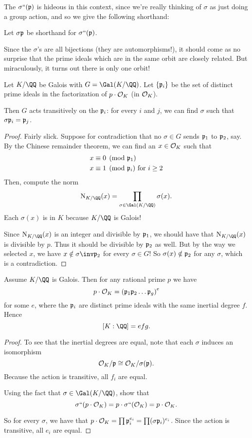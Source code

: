 The $\sigma``(\mathfrak p)$ is hideous in this context, since we're really thinking
of $\sigma$ as just doing a group action, and so we give the following shorthand:
\begin{abuse}
	Let $\sigma\mathfrak p$ be shorthand for $\sigma``(\mathfrak p)$.
\end{abuse}

Since the $\sigma$'s are all bijections (they are automorphisms!),
it should come as no surprise that the prime ideals which are in the same
orbit are closely related.
But miraculously, it turns out there is only one orbit!
\begin{theorem}
	Let $K/\QQ$ be Galois with $G = \Gal(K/\QQ)$.
	Let $\{\mathfrak p_i\}$ be the set of distinct prime ideals in
	the factorization of $p \cdot \mathcal O_K$ (in $\mathcal O_K$).

	Then $G$ acts transitively on the $\mathfrak p_i$:
	for every $i$ and $j$, we can find $\sigma$ such that $\sigma\mathfrak p_i = \mathfrak p_j$.
\end{theorem}
\begin{proof}
	Fairly slick.
	Suppose for contradiction that no $\sigma \in G$ sends $\mathfrak p_1$ to $\mathfrak p_2$, say.
	By the Chinese remainder theorem, we can find an $x \in \mathcal O_K$ such that
	\begin{align*}
		x &\equiv 0 \pmod{\mathfrak p_1} \\
		x &\equiv 1 \pmod{\mathfrak p_i} \text{ for $i \ge 2$}
	\end{align*}
	Then, compute the norm
	\[ \NK(x) = \prod_{\sigma \in \Gal(K/\QQ)} \sigma(x). \]
	Each $\sigma(x)$ is in $K$ because $K/\QQ$ is Galois!

	Since $\NK(x)$ is an integer and divisible by $\mathfrak p_1$,
	we should have that $\NK(x)$ is divisible by $p$.
	Thus it should be divisible by $\mathfrak p_2$ as well.
	But by the way we selected $x$, we have $x \notin \sigma\inv\pp_2$ for every $\sigma \in G$!
	So $\sigma(x) \notin \mathfrak p_2$ for any $\sigma$, which is a contradiction.
\end{proof}
\begin{theorem}
	Assume $K/\QQ$ is Galois.
	Then for any rational prime $p$ we have
	\[ p \cdot \mathcal O_K = \left( \mathfrak p_1 \mathfrak p_2 \dots \mathfrak p_g \right)^e \]
	for some $e$, where the $\mathfrak p_i$ are distinct prime ideals
	with the same inertial degree $f$.
	Hence \[ [K:\QQ] = efg. \]
\end{theorem}
\begin{proof}
	To see that the inertial degrees are equal, note that each $\sigma$
	induces an isomorphism
	\[ \mathcal O_K / \mathfrak p \cong \mathcal O_K / \sigma(\mathfrak p). \]
	Because the action is transitive, all $f_i$ are equal.
	\begin{exercise}
		Using the fact that $\sigma \in \Gal(K/\QQ)$,
		show that \[ \sigma``(p \cdot \mathcal O_K) = p \cdot \sigma``(\mathcal O_K) = p \cdot \mathcal O_K. \]
	\end{exercise}
	So for every $\sigma$, we have that
	$p \cdot \mathcal O_K = \prod \mathfrak p_i^{e_i} = \prod (\sigma\mathfrak p_i)^{e_i}$.
	Since the action is transitive, all $e_i$ are equal.
\end{proof}

